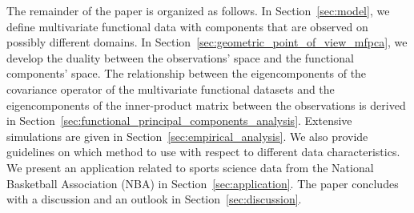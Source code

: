 The remainder of the paper is organized as follows. In Section~\ref{sec:model}, we define multivariate functional data with components that are observed on possibly different domains. In Section~\ref{sec:geometric_point_of_view_mfpca}, we develop the duality between the observations' space and the functional components' space. The relationship between the eigencomponents of the covariance operator of the multivariate functional datasets and the eigencomponents of the inner-product matrix between the observations is derived in Section~\ref{sec:functional_principal_components_analysis}. Extensive simulations are given in Section~\ref{sec:empirical_analysis}. We also provide guidelines on which method to use with respect to different data characteristics. We present an application related to sports science data from the National Basketball Association (NBA) in Section~\ref{sec:application}. The paper concludes with a discussion and an outlook in Section~\ref{sec:discussion}.

